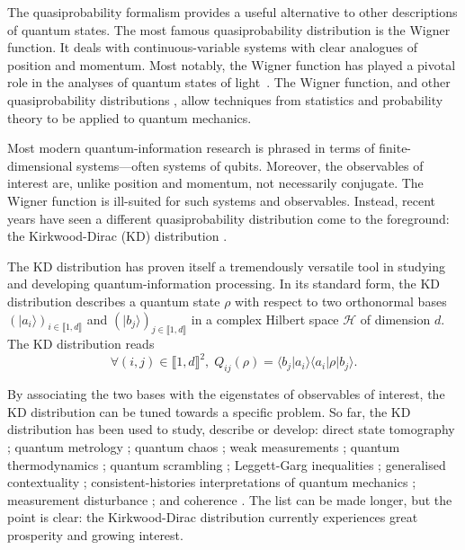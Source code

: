 \documentclass[a4paper, notitlepage, 11pt]{article}
\numberwithin{equation}{section}
\newcommand{\bra}[1]{\langle #1|}
\newcommand{\cket}[1]{|#1\rangle}
\newcommand{\bracket}[2]{\langle #1|#2\rangle}
\renewcommand{\H}{\mathcal{H}}
\newcommand{\IntEnt}[2]{\llbracket #1 , #2 \rrbracket}
\begin{document}
The quasiprobability formalism provides a useful alternative to other descriptions of quantum states.  The most famous quasiprobability distribution is the Wigner function. It deals with continuous-variable systems with clear analogues of position and momentum. Most notably, the Wigner function has played a pivotal role in the analyses of quantum states of light~\cite{cagl69a, cagl69b, leonhardt2010, serafini2017}. The Wigner function, and other quasiprobability distributions {\cite{Husimi40, Sudarshan63, Glauber63, Terletsky37, Margenau61, Johansen04, Johansen04-2}}, allow techniques from statistics and probability theory to be applied to quantum mechanics. 

Most  modern quantum-information research is phrased in terms of finite-dimensional systems---often systems of qubits. Moreover, the observables of interest are, unlike position and momentum, not necessarily conjugate. The Wigner function is ill-suited for such systems and observables. Instead,  recent years have seen a different  quasiprobability distribution come to the foreground: the Kirkwood-Dirac (KD) distribution {\cite{kirkwood1933, dirac1945, YuSwDr18, arvidsson-shukuretal2021, debievre2021, debievre2023a}}. 

The KD distribution has proven itself a tremendously versatile tool in studying and developing  quantum-information processing.  In its standard form, the KD distribution describes a quantum state $\rho$ with respect to two orthonormal bases  $ \left(\cket{a_i}\right)_{i\in\IntEnt{1}{d}}$ and $\left(\cket{b_j}\right)_{j\in\IntEnt{1}{d}}$ in a complex Hilbert space $\H$ of dimension $d$. The KD distribution  reads
\begin{equation}\label{eq:KDGV1}
\forall (i,j)\in \IntEnt{1}{d}^2, \; Q_{ij}(\rho) = \bracket{b_j}{a_i}\bra{a_i}\rho\cket{b_j}.
\end{equation}

By associating the two bases with the eigenstates of observables of interest, the KD distribution can be tuned towards a specific problem.  So far, the KD distribution has been used  to study, describe or develop: direct state tomography {\cite{Johansen04, Lundeen11, lundeenbamber2012, bamberlundeen2014, thekkadathetal2016}}; quantum metrology {\cite{arvidsson-shukuretal2020, Jenne22, lupu-gladsteinetal2021}}; quantum chaos {\cite{Yunger17, YuSwDr18, Yunger18-2, GoHaDr19, Razieh19}}; weak measurements {\cite{Aharonov88, Duck89, Dressel14,pusey2014, Dressel12, YuSwDr18,Kunjwal19, Monroe20, Wagner23}}; quantum thermodynamics {\cite{Yunger17, lostaglioetal2022, Levy20, Lostaglio20, Hernandez23, Upadhyaya23}}; quantum scrambling {\cite{YuSwDr18, Yunger18-2}}; Leggett-Garg inequalities {\cite{Suzuki12, Suzuki16, Halliwell16}}; generalised contextuality {\cite{pusey2014, Levy20, Lostaglio20}}; consistent-histories interpretations of quantum mechanics {\cite{Griffiths84}}; measurement disturbance {\cite{hofmann2011, Dressel12, dressel2015, debievre2021, debievre2023a, Fiorentino22, Gao23}}{; and coherence \cite{Budiyono23}}. The list can be made longer, but the point is clear: the Kirkwood-Dirac distribution  currently experiences great prosperity and growing interest.  
\end{document}

